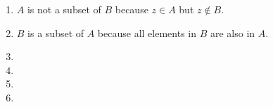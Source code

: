 \begin{enumerate}[label=\textbf{\alph*.}]
	\item $ A $ is not a subset of $ B $ because $ z \in A $ but $ z \notin B $.
	\item $ B $ is a subset of $ A $ because all elements in $ B $ are also in $ A $.
	\item {}
	\item {}
	\item {}
	\item {}
\end{enumerate}